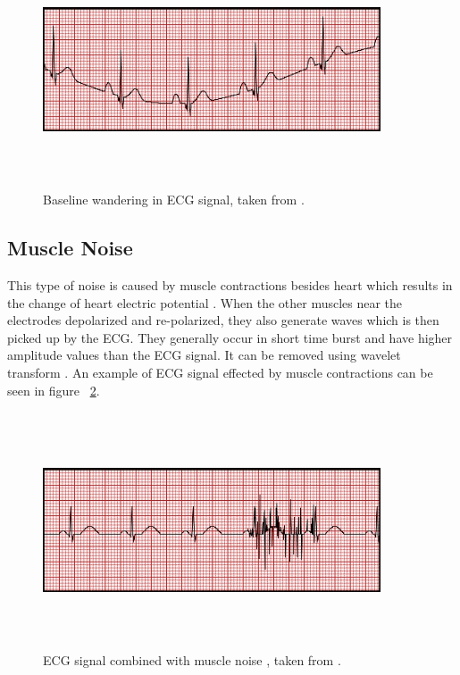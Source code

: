 \begin{figure}[htpb]
	\centering
	\includegraphics[width=10cm,height=7cm,keepaspectratio=true]{images/WBaseline}
	\caption{
		Baseline wandering in ECG signal, taken from \cite{ecg_artifacts}.
	}
	\label{fig:WBaseline}
\end{figure}

\subsection{Muscle Noise}
This type of noise is caused by muscle contractions besides heart which results in the change of heart electric potential \cite{markovski2013ict}. When the other muscles near the electrodes depolarized and re-polarized, they also generate waves which is then picked up by the ECG. They generally occur in short time burst and have higher amplitude values than the ECG signal. It can be removed using wavelet transform \cite{6091791}. An example of ECG signal effected by muscle contractions can be seen in figure ~\ref{fig:Tremor}.

\begin{figure}[htpb]
	\centering
	\includegraphics[width=10cm,height=7cm,keepaspectratio=true]{images/Tremor}
	\caption{
		ECG signal combined with muscle noise , taken from \cite{ecg_artifacts}.
	}
	\label{fig:Tremor}
\end{figure}

